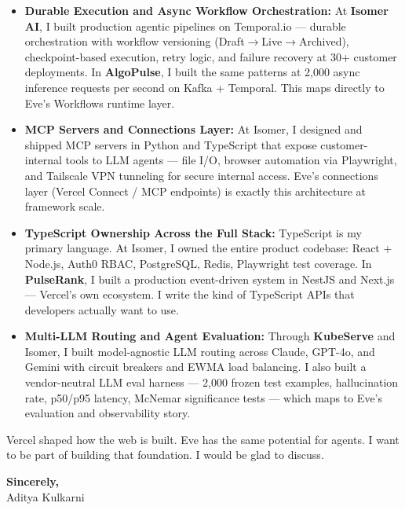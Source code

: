 \documentclass[11pt,letterpaper]{article}
\begin{document}
\begin{itemize}[leftmargin=*, itemsep=3pt, label={\color{VercelBlack}\faAngleRight}]
    \item \textbf{Durable Execution and Async Workflow Orchestration:} At \textbf{Isomer AI}, I built production agentic pipelines on Temporal.io --- durable orchestration with workflow versioning (Draft$\to$Live$\to$Archived), checkpoint-based execution, retry logic, and failure recovery at 30+ customer deployments. In \textbf{AlgoPulse}, I built the same patterns at 2,000 async inference requests per second on Kafka + Temporal. This maps directly to Eve's Workflows runtime layer.

    \item \textbf{MCP Servers and Connections Layer:} At Isomer, I designed and shipped MCP servers in Python and TypeScript that expose customer-internal tools to LLM agents --- file I/O, browser automation via Playwright, and Tailscale VPN tunneling for secure internal access. Eve's connections layer (Vercel Connect / MCP endpoints) is exactly this architecture at framework scale.

    \item \textbf{TypeScript Ownership Across the Full Stack:} TypeScript is my primary language. At Isomer, I owned the entire product codebase: React + Node.js, Auth0 RBAC, PostgreSQL, Redis, Playwright test coverage. In \textbf{PulseRank}, I built a production event-driven system in NestJS and Next.js --- Vercel's own ecosystem. I write the kind of TypeScript APIs that developers actually want to use.

    \item \textbf{Multi-LLM Routing and Agent Evaluation:} Through \textbf{KubeServe} and Isomer, I built model-agnostic LLM routing across Claude, GPT-4o, and Gemini with circuit breakers and EWMA load balancing. I also built a vendor-neutral LLM eval harness --- 2,000 frozen test examples, hallucination rate, p50/p95 latency, McNemar significance tests --- which maps to Eve's evaluation and observability story.
\end{itemize}

\vspace{6pt}

Vercel shaped how the web is built. Eve has the same potential for agents. I want to be part of building that foundation. I would be glad to discuss.

\vspace{12pt}

\textbf{Sincerely,}\\[8pt]
Aditya Kulkarni
\end{document}
